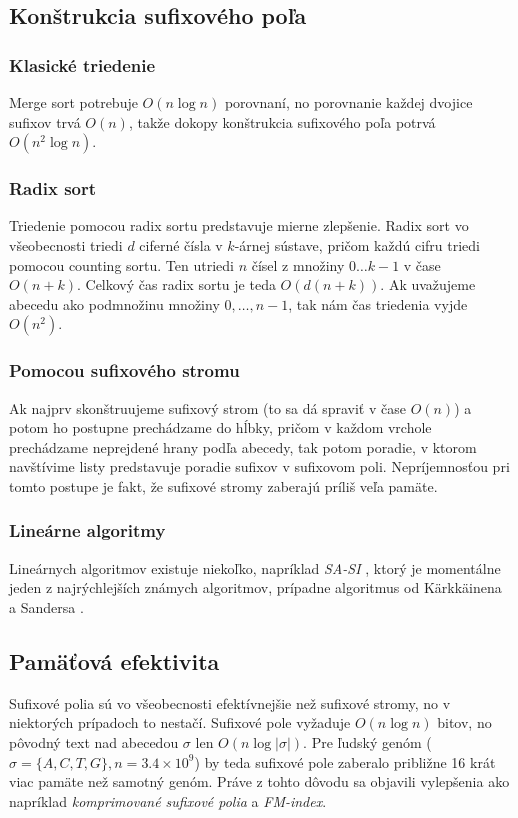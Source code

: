     \subsection{Konštrukcia sufixového poľa}
    
    \subsubsection{Klasické triedenie}
    Merge sort potrebuje $O(n \log{n})$ porovnaní, no porovnanie každej dvojice sufixov trvá $O(n)$, takže dokopy konštrukcia sufixového poľa potrvá $O(n^2 \log{n})$.
    
    \subsubsection{Radix sort}
    Triedenie pomocou radix sortu predstavuje mierne zlepšenie. Radix sort vo všeobecnosti triedi $d$ ciferné čísla v $k$-árnej sústave, pričom každú cifru triedi pomocou counting sortu. Ten utriedi $n$ čísel z množiny ${0 \ldots k - 1}$ v čase $O(n + k)$. Celkový čas radix sortu je teda $O(d (n + k))$. Ak uvažujeme abecedu ako podmnožinu množiny ${0, \ldots, n - 1}$, tak nám čas triedenia vyjde $O(n^2)$.
    \subsubsection{Pomocou sufixového stromu}
Ak najprv skonštruujeme sufixový strom (to sa dá spraviť v čase $O(n)$) a potom ho postupne prechádzame do hĺbky, pričom v každom vrchole prechádzame neprejdené hrany podľa abecedy, tak potom poradie, v ktorom navštívime listy predstavuje poradie sufixov v sufixovom poli. Nepríjemnosťou pri tomto postupe je fakt, že sufixové stromy zaberajú príliš veľa pamäte.

    \subsubsection{Lineárne algoritmy}
    Lineárnych algoritmov existuje niekoľko, napríklad \emph{SA-SI} \cite{NZC09}, ktorý je momentálne jeden z najrýchlejších známych algoritmov, prípadne algoritmus od Kärkkäinena a Sandersa \cite{KS03}.
        
    
    \subsection{Pamäťová efektivita}
    Sufixové polia sú vo všeobecnosti efektívnejšie než sufixové stromy, no v
    niektorých prípadoch to nestačí. Sufixové pole vyžaduje $O(n \log{n})$
    bitov, no pôvodný text nad abecedou $\sigma$ len $O(n
    \log{\lvert \sigma \rvert})$. Pre ľudský genóm ($\sigma = \{A, C, T, G\}, n
    = 3.4 \times 10^9$) by teda sufixové pole zaberalo približne 16 krát viac
    pamäte než samotný genóm. Práve z tohto dôvodu sa objavili vylepšenia ako
    napríklad \textit{komprimované sufixové polia} a \textit{FM-index}.
    
